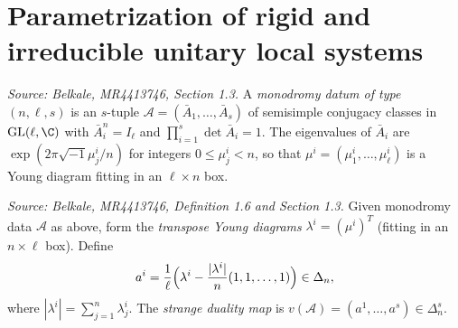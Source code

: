 \section{Parametrization of rigid and irreducible unitary local systems}

\begin{definition}[MonodromyData]
  \label{def:monodromy-data}
  \uses{}
  \textit{Source: Belkale, MR4413746, Section 1.3.}
  A \emph{monodromy datum of type \((n, \ell, s)\)} is an \(s\)-tuple \(\mathcal{A} = (\bar{A}_1, \ldots, \bar{A}_s)\) of semisimple conjugacy classes in \(\mathrm{GL}(\ell, \C)\) with \(\bar{A}_i^n = I_\ell\) and \(\prod_{i=1}^s \det \bar{A}_i = 1\). The eigenvalues of \(\bar{A}_i\) are \(\exp(2\pi \sqrt{-1} \mu^i_j / n)\) for integers \(0 \leq \mu^i_j < n\), so that \(\mu^i = (\mu^i_1, \ldots, \mu^i_\ell)\) is a Young diagram fitting in an \(\ell \times n\) box.
\end{definition}

\begin{definition}[StrangeDualityMap]
  \label{def:strange-duality-map}
  \textit{Source: Belkale, MR4413746, Definition 1.6 and Section 1.3.}
  Given monodromy data \(\mathcal{A}\) as above, form the \emph{transpose Young diagrams} \(\lambda^i = (\mu^i)^T\) (fitting in an \(n \times \ell\) box). Define
  \[
    a^i = \frac{1}{\ell} \Bigl( \lambda^i - \frac{|\lambda^i|}{n}(1, 1, \ldots, 1) \Bigr) \in \Delta_n,
  \]
  where \(|\lambda^i| = \sum_{j=1}^n \lambda^i_j\). The \emph{strange duality map} is \(v(\mathcal{A}) = (a^1, \ldots, a^s) \in \Delta_n^s\).
\end{definition}


